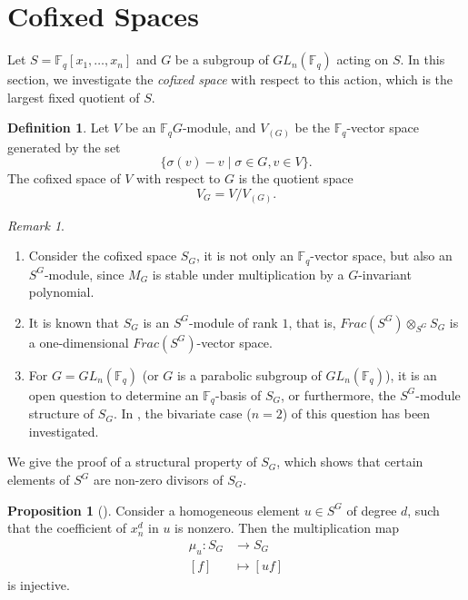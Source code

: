 \documentclass[12pt,a4paper]{report}
\theoremstyle{definition}
\newtheorem{definition}[theorem]{Definition}
\newtheorem{proposition}[theorem]{Proposition}
\theoremstyle{remark}
\newtheorem*{remark}{Remark}
\theoremstyle{definition}
\begin{document}
\section{Cofixed Spaces}\label{sec:cofixed_spaces}
Let $S = \mathbb{F}_q[x_1, \ldots, x_n]$ and $G$ be a subgroup of $GL_n(\mathbb{F}_q)$ acting on $S$. In this section, we investigate the \emph{cofixed space} with respect to this action, which is the largest fixed quotient of $S$. 
\begin{definition}\label{def:cofixed_space}
    Let $V$ be an $\mathbb{F}_q G$-module, and $V_{(G)}$ be the $\mathbb{F}_q$-vector space generated by the set
    \begin{equation*}
        \{\sigma(v) - v\mid \sigma\in G, v\in V\}.
    \end{equation*}
    The cofixed space of $V$ with respect to $G$ is the quotient space
    \begin{equation*}
        V_G = V/V_{(G)}.
    \end{equation*}
\end{definition}
\begin{remark}
\begin{enumerate}
    \item 
Consider the cofixed space $S_G$, it is not only an $\mathbb{F}_q$-vector space, but also an $S^G$-module, since $M_G$ is stable under multiplication by a $G$-invariant polynomial.
\item It is known \cite[Proposition 5.7]{Lewis_Reiner_Stanton_2017} that $S_G$ is an $S^G$-module of rank $1$, that is, $Frac(S^G)\otimes_{S^G}S_G$ is a one-dimensional $Frac(S^G)$-vector space.
    \item For $G = GL_n(\mathbb{F}_q)$ (or $G$ is a parabolic subgroup of $GL_n(\mathbb{F}_q)$), it is an open question to determine an $\mathbb{F}_q$-basis of $S_G$, or furthermore, the $S^G$-module structure of $S_G$. In \cite[Appendix]{Lewis_Reiner_Stanton_2017}, the bivariate case ($n=2$) of this question has been investigated.
\end{enumerate}
\end{remark}
We give the proof of a structural property of $S_G$, which shows that certain elements of $S^G$ are non-zero divisors of $S_G$.
\begin{proposition}[{\cite[Lemma 6.3]{karagueguzian_symonds_examples}}]\label{prop:injectivity_cofix}
    Consider a homogeneous element $u\in S^G$ of degree $d$, such that the coefficient of $x_n^d$ in $u$ is nonzero. Then the multiplication map
    \begin{align*}
        \mu_u: S_G &\to S_G\\
        [f]&\mapsto [uf]
    \end{align*}
    is injective.
\end{proposition}
\end{document}
